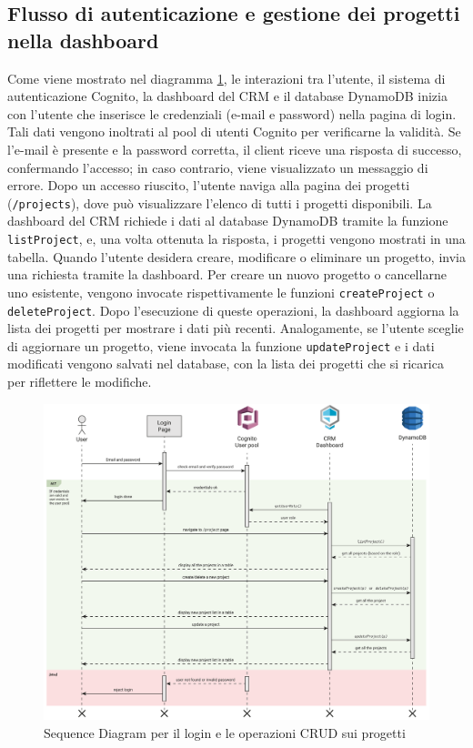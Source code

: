 \documentclass[target=bach,aauheader=,style=]{thud}
\begin{document}
\subsection{Flusso di autenticazione e gestione dei progetti nella dashboard}
Come viene mostrato nel diagramma \ref{diagramma_sequenza}, le interazioni tra l'utente, il sistema di autenticazione Cognito, la dashboard del CRM e il database DynamoDB inizia con l'utente che inserisce le credenziali (e-mail e password) nella pagina di login. Tali dati vengono inoltrati al pool di utenti Cognito per verificarne la validità. Se l'e-mail è presente e la password corretta, il client riceve una risposta di successo, confermando l'accesso; in caso contrario, viene visualizzato un messaggio di errore. Dopo un accesso riuscito, l'utente naviga alla pagina dei progetti (\texttt{/projects}), dove può visualizzare l'elenco di tutti i progetti disponibili. La dashboard del CRM richiede i dati al database DynamoDB tramite la funzione \texttt{listProject}, e, una volta ottenuta la risposta, i progetti vengono mostrati in una tabella. Quando l'utente desidera creare, modificare o eliminare un progetto, invia una richiesta tramite la dashboard. Per creare un nuovo progetto o cancellarne uno esistente, vengono invocate rispettivamente le funzioni \texttt{createProject} o \texttt{deleteProject}. Dopo l'esecuzione di queste operazioni, la dashboard aggiorna la lista dei progetti per mostrare i dati più recenti. Analogamente, se l'utente sceglie di aggiornare un progetto, viene invocata la funzione \texttt{updateProject} e i dati modificati vengono salvati nel database, con la lista dei progetti che si ricarica per riflettere le modifiche.

\begin{figure}[H]
    \centering
    \includegraphics[width=1\textwidth]{img/diagrammi/sequence.pdf} 
    \caption{Sequence Diagram per il login e le operazioni CRUD sui progetti}
    \label{diagramma_sequenza}
\end{figure}
\end{document}

